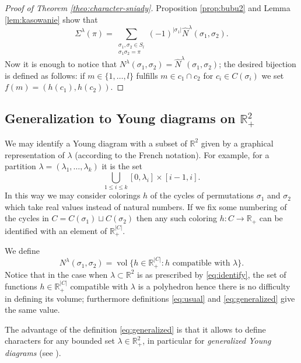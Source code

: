 \documentclass[12pt]{amsart}
\theoremstyle{plain}
\theoremstyle{remark}
\newcommand{\R}{\mathbb{R}}
\DeclareMathOperator{\vol}{vol}
\begin{document}
\begin{proof}[Proof of Theorem \ref{theo:character-sniady}]
Proposition \ref{prop:bubu2} and Lemma \ref{lem:kasowanie} show that 
$$ \Sigma^{\lambda}(\pi)= \sum_{\substack{\sigma_1,\sigma_2\in S_l\\ \sigma_1 \sigma_2=\pi}}
(-1)^{|\sigma_1|} \hat{N}^{\lambda}(\sigma_1,\sigma_2).$$
Now it is enough to notice that $N^{\lambda}(\sigma_1,\sigma_2)=\hat{N}^{\lambda}(\sigma_1,\sigma_2)$;
the desired bijection is defined as follows: if $m\in\{1,\dots,l\}$ fulfills
$m\in c_1\cap c_2$ for $c_i\in C(\sigma_i)$ we set $f(m)=(h(c_1),h(c_2))$.
\end{proof}




\subsection{Generalization to Young diagrams on $\R_+^2$}
We may identify a Young diagram  
with a subset of $\R^2$ given by a graphical representation of $\lambda$ 
(according to the French notation). For example, for a partition
 $\lambda=(\lambda_1,\dots,\lambda_k)$  it is the set 
\begin{equation}
\label{eq:identify}
\bigcup_{1\leq i\leq k}   [0,\lambda_i] \times  [i-1,i] .   
\end{equation}
In this way we may consider colorings $h$ of the cycles of permutations
$\sigma_1$ and $\sigma_2$ which take real values instead of natural numbers. 
If we fix some numbering of the cycles in $C=C(\sigma_1)\sqcup C(\sigma_2)$ 
then any such coloring $h\colon C\rightarrow\R_+$ 
can be identified with an element of $\R_+^{|C|}$.

We define
\begin{equation}
\label{eq:generalized}
N^{\lambda}(\sigma_1,\sigma_2)= \vol \{h\in \R_+^{|C|}:h \text{ compatible with } \lambda \}. 
\end{equation}
Notice that in the case when $\lambda\subset\R^2$ is as prescribed by \eqref{eq:identify},
the set of functions $h\in \R_+^{|C|}$ compatible with $\lambda$ is a polyhedron hence there
is no difficulty in defining its volume; furthermore definitions \eqref{eq:usual} and
\eqref{eq:generalized} give the same value.

The advantage of the definition \eqref{eq:generalized} is that it allows to define characters
for any bounded set $\lambda\in\R_+^2$, in particular for \emph{generalized Young diagrams} (see \cite{Kerov1993}).
\end{document}
